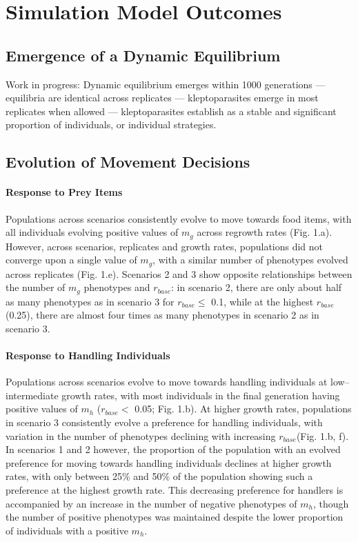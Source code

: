 \documentclass[11pt]{article}
\begin{document}
\section*{Simulation Model Outcomes}

\subsection*{Emergence of a Dynamic Equilibrium}

Work in progress: Dynamic equilibrium emerges within 1000 generations --- equilibria are identical across replicates --- kleptoparasites emerge in most replicates when allowed --- kleptoparasites establish as a stable and significant proportion of individuals, or individual strategies.

\subsection*{Evolution of Movement Decisions}

\paragraph*{Response to Prey Items}

Populations across scenarios consistently evolve to move towards food items, with all individuals evolving positive values of $m_g$ across regrowth rates (Fig. 1.a).
However, across scenarios, replicates and growth rates, populations did not converge upon a single value of $m_g$, with a similar number of phenotypes evolved across replicates (Fig. 1.e).
Scenarios 2 and 3 show opposite relationships between the number of $m_g$ phenotypes and $r_{base}$: in scenario 2, there are only about half as many phenotypes as in scenario 3 for $r_{base} \leq$ 0.1, while at the highest $r_{base}$ (0.25), there are almost four times as many phenotypes in scenario 2 as in scenario 3.

\paragraph*{Response to Handling Individuals}

Populations across scenarios evolve to move towards handling individuals at low--intermediate growth rates, with most individuals in the final generation having positive values of $m_h$ ($r_{base} <$ 0.05; Fig. 1.b).
At higher growth rates, populations in scenario 3 consistently evolve a preference for handling individuals, with variation in the number of phenotypes declining with increasing $r_{base} $(Fig. 1.b, f).
In scenarios 1 and 2 however, the proportion of the population with an evolved preference for moving towards handling individuals declines at higher growth rates, with only between 25\% and 50\% of the population showing such a preference at the highest growth rate.
This decreasing preference for handlers is accompanied by an increase in the number of negative phenotypes of $m_h$, though the number of positive phenotypes was maintained despite the lower proportion of individuals with a positive $m_h$.
\end{document}
